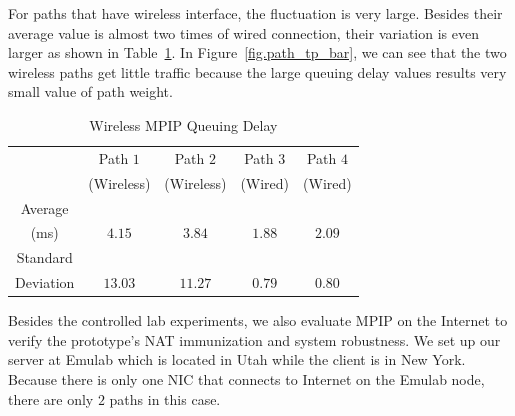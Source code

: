 For paths that have wireless interface, the fluctuation is very large. Besides their average value is almost two times of wired connection, their variation is even larger as shown in Table~\ref{tb.wireless}. In Figure~\ref{fig.path_tp_bar}, we can see that the two wireless paths get little traffic because the large queuing delay values results very small value of path weight.


\begin{table}
\caption{\label{tb.wireless}Wireless MPIP Queuing Delay}
\centering
\begin{tabular}{|c|c|c|c|c|}
\hline
  & Path $1$   &  Path $2$   &  Path $3$ &  Path $4$\\
  & (Wireless) &  (Wireless) &  (Wired)  &  (Wired) \\
\hline
Average &   &   &   & \\
(ms) & $4.15$ & $3.84$ & $1.88$ & $2.09$ \\
\hline
Standard &   &   &   & \\
Deviation  & $13.03$ & $11.27$ & $0.79$ & $0.80$ \\
\hline
\end{tabular}
\end{table}

%

Besides the controlled lab experiments, we also evaluate MPIP on the Internet to verify the prototype's NAT immunization and system robustness. We set up our server at Emulab\cite{emulab} which is located in Utah while the client is in New York. Because there is only one NIC that connects to Internet on the Emulab node, there are only $2$ paths in this case.

